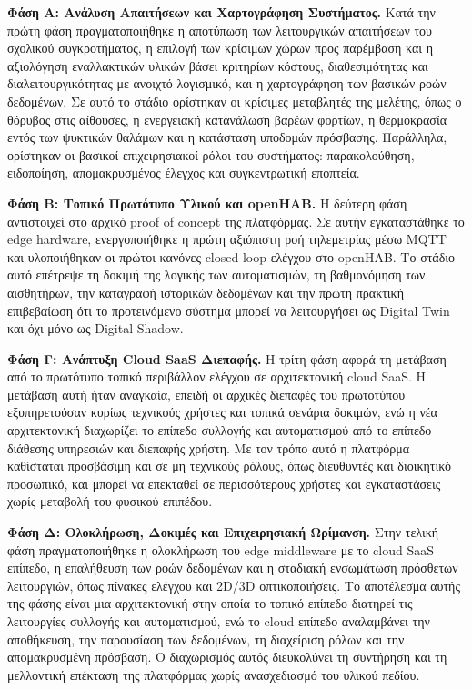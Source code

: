 \noindent\textbf{Φάση Α: Ανάλυση Απαιτήσεων και Χαρτογράφηση Συστήματος.} Κατά την πρώτη φάση πραγματοποιήθηκε η αποτύπωση των λειτουργικών απαιτήσεων του σχολικού συγκροτήματος, η επιλογή των κρίσιμων χώρων προς παρέμβαση και η αξιολόγηση εναλλακτικών υλικών βάσει κριτηρίων κόστους, διαθεσιμότητας και διαλειτουργικότητας με ανοιχτό λογισμικό, και η χαρτογράφηση των βασικών ροών δεδομένων. Σε αυτό το στάδιο ορίστηκαν οι κρίσιμες μεταβλητές της μελέτης, όπως ο θόρυβος στις αίθουσες, η ενεργειακή κατανάλωση βαρέων φορτίων, η θερμοκρασία εντός των ψυκτικών θαλάμων και η κατάσταση υποδομών πρόσβασης. Παράλληλα, ορίστηκαν οι βασικοί επιχειρησιακοί ρόλοι του συστήματος: παρακολούθηση, ειδοποίηση, απομακρυσμένος έλεγχος και συγκεντρωτική εποπτεία.

\noindent\textbf{Φάση Β: Τοπικό Πρωτότυπο Υλικού και \textlatin{openHAB}.} Η δεύτερη φάση αντιστοιχεί στο αρχικό \textlatin{proof of concept} της πλατφόρμας. Σε αυτήν εγκαταστάθηκε το \textlatin{edge hardware}, ενεργοποιήθηκε η πρώτη αξιόπιστη ροή τηλεμετρίας μέσω \textlatin{MQTT} και υλοποιήθηκαν οι πρώτοι κανόνες \textlatin{closed-loop} ελέγχου στο \textlatin{openHAB}. Το στάδιο αυτό επέτρεψε τη δοκιμή της λογικής των αυτοματισμών, τη βαθμονόμηση των αισθητήρων, την καταγραφή ιστορικών δεδομένων και την πρώτη πρακτική επιβεβαίωση ότι το προτεινόμενο σύστημα μπορεί να λειτουργήσει ως \textlatin{Digital Twin} και όχι μόνο ως \textlatin{Digital Shadow}.

\noindent\textbf{Φάση Γ: Ανάπτυξη \textlatin{Cloud SaaS} Διεπαφής.} Η τρίτη φάση αφορά τη μετάβαση από το πρωτότυπο τοπικό περιβάλλον ελέγχου σε αρχιτεκτονική \textlatin{cloud SaaS}. Η μετάβαση αυτή ήταν αναγκαία, επειδή οι αρχικές διεπαφές του πρωτοτύπου εξυπηρετούσαν κυρίως τεχνικούς χρήστες και τοπικά σενάρια δοκιμών, ενώ η νέα αρχιτεκτονική διαχωρίζει το επίπεδο συλλογής και αυτοματισμού από το επίπεδο διάθεσης υπηρεσιών και διεπαφής χρήστη. Με τον τρόπο αυτό η πλατφόρμα καθίσταται προσβάσιμη και σε μη τεχνικούς ρόλους, όπως διευθυντές και διοικητικό προσωπικό, και μπορεί να επεκταθεί σε περισσότερους χρήστες και εγκαταστάσεις χωρίς μεταβολή του φυσικού επιπέδου.

\noindent\textbf{Φάση Δ: Ολοκλήρωση, Δοκιμές και Επιχειρησιακή Ωρίμανση.} Στην τελική φάση πραγματοποιήθηκε η ολοκλήρωση του \textlatin{edge middleware} με το \textlatin{cloud SaaS} επίπεδο, η επαλήθευση των ροών δεδομένων και η σταδιακή ενσωμάτωση πρόσθετων λειτουργιών, όπως πίνακες ελέγχου και \textlatin{2D/3D} οπτικοποιήσεις. Το αποτέλεσμα αυτής της φάσης είναι μια αρχιτεκτονική στην οποία το τοπικό επίπεδο διατηρεί τις λειτουργίες συλλογής και αυτοματισμού, ενώ το \textlatin{cloud} επίπεδο αναλαμβάνει την αποθήκευση, την παρουσίαση των δεδομένων, τη διαχείριση ρόλων και την απομακρυσμένη πρόσβαση. Ο διαχωρισμός αυτός διευκολύνει τη συντήρηση και τη μελλοντική επέκταση της πλατφόρμας χωρίς ανασχεδιασμό του υλικού πεδίου.

